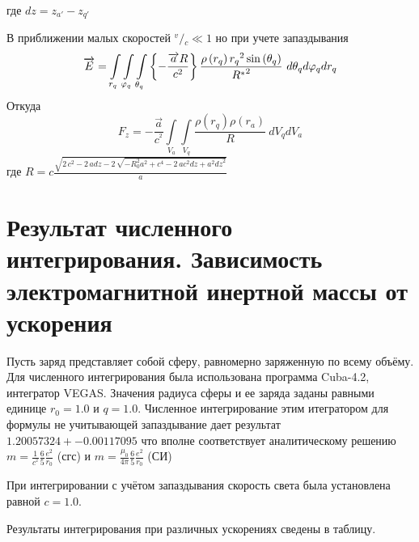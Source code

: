 \documentclass{article}
\begin{document}
где
$\mathit{dz} = z_{a'} - z_{q'}$


В приближении малых скоростей ${}^{v}/{}_{c}\ll 1$ но при учете запаздывания
\[\overrightarrow{E}=\int\limits_{{{r}_{q}}}\int\limits_{{{\varphi}_{q}}}\int\limits_{{{\theta}_{q}}}\\
{\left\{ -\frac{\overrightarrow{a}R}{{{c}^{2}}} \right\}\frac{\rho \left( {{r}_{q}} \right){{r}_{q}}^{2}\sin \left( {{\theta }_{q}} \right)}{{{R}^{*}}^{2}}\ }d{{\theta }_{q}}d{{\varphi }_{q}}d{{r}_{q}}\]
 Откуда
\[{{F}_{z}}=-\frac{\overrightarrow{a}}{{{c}^{^{2}}}}\int\limits_{{{V}_{a}}}{\int\limits_{{{V}_{q}}}{\frac{\rho \left( {{r}_{q}} \right)\rho \left( {{r}_{a}} \right)}{R}}}\ d{{V}_{q}}d{{V}_{a}}\]
где
$\mathit{R} = c\frac{\sqrt{2 \, c^{2} - 2 \, a \mathit{dz} - 2 \, \sqrt{-R_{0}^{2} a^{2} + c^{4} - 2 \, a c^{2} \mathit{dz} + a^{2} \mathit{dz}^{2}}}}{a}$

\section{Результат численного интегрирования. Зависимость электромагнитной инертной массы от ускорения}

Пусть заряд представляет собой сферу, равномерно заряженную по всему объёму.
Для численного интегрирования была использована программа Cuba-4.2, интегратор VEGAS.
Значения радиуса сферы и ее заряда заданы равными единице $r_{0} = 1.0$ и $q = 1.0$.
Численное интегрирование этим итегратором для формулы не учитывающей запаздывание дает результат
$1.20057324 +- 0.00117095$ что вполне соответствует аналитическому решению
$m =\frac{1}{{{c}^{^{2}}}}\frac{6}{5}\frac{e^2}{{{r}_{0}}}$ (сгс) и
$m =\frac{{{\mu }_{0}}}{4\pi }\frac{6}{5}\frac{e^2}{{{r}_{0}}}$ (СИ)

При интегрировании с учётом запаздывания скорость света была установлена равной $c = 1.0$.

Результаты интегрирования при различных ускорениях сведены в таблицу.
\end{document}
